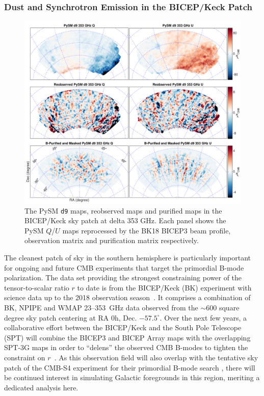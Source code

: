 \documentclass[twocolumn]{aastex631}
\begin{document}
\subsubsection{Dust and Synchrotron Emission in the BICEP/Keck Patch}
\label{sec:BK_validation}
\begin{figure}
    \centering
    \includegraphics[width=2.\columnwidth]{figures/pysm_d9_353_delta_reobs_B_pub.pdf}
    \caption{The PySM \texttt{d9} maps, reobserved maps and purified maps in the BICEP/Keck sky patch at delta 353 GHz. Each panel shows the
    PySM $Q$/$U$ maps reprocessed by the BK18 BICEP3 beam profile, observation matrix and purification matrix respectively.}
    \label{fig:psym_BKmatrix}
\end{figure}

The cleanest patch of sky in the southern hemisphere is particularly important for ongoing and future CMB experiments that target the primordial B-mode polarization. The data set providing the strongest constraining power of the tensor-to-scalar ratio $r$ to date is from the BICEP/Keck (BK) experiment with science data up to the 2018 observation season~\citep[``BK18'';][]{Ade:2021}. It comprises a combination of BK, NPIPE and WMAP 23--353~GHz data observed from the $\sim 600$ square degree sky patch centering at RA 0h, Dec. $-57.5^{\circ}$. Over the next few years, a collaborative effort between the BICEP/Keck and the South Pole Telescope (SPT) will combine the BICEP3 and BICEP Array maps with the overlapping SPT-3G maps in order to ``delens'' the observed CMB B-modes to tighten the constraint on $r$~\citep{TheBICEP/KeckCollaboration:2024}. As this observation field will also overlap with the tentative sky patch of the CMB-S4 experiment for their primordial B-mode search \citep{Abazajian:2022}, there will be continued interest in simulating Galactic foregrounds in this region, meriting a dedicated analysis here. 
\end{document}
